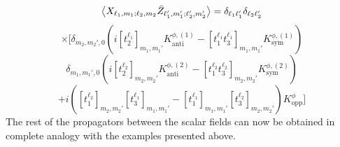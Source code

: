 %
%
\begin{equation*}
\expval{
X_{\ell_1,m_1;\ell_2,m_2}
\bar{Z}_{\ell_1',m_1';\ell_2',m_2'}
}
=
\delta_{\ell_1 \ell_1'} \delta_{\ell_2 \ell_2'}
\end{equation*}
%
%
\begin{equation*}
\times
\Bigg[
\delta_{m_2, m_2',0}
\left(
i [t_2^{\ell_1}]_{m_1,m_1'} K^{\phi,(1)}_{\text{anti}}
- [t_1^{\ell_1} t_3^{\ell_1}]_{m_1,m_1'} K^{\phi,(1)}_{\text{sym}}
\right)
\end{equation*}
%
%
\begin{equation*}
\delta_{m_1, m_1',0}
\left(
i [t_2^{\ell_2}]_{m_2,m_2'} K^{\phi,(2)}_{\text{anti}}
- [t_1^{\ell_2} t_3^{\ell_2}]_{m_2,m_2'} K^{\phi,(2)}_{\text{sym}}
\right)
\end{equation*}
%
%
\begin{equation}
+ i \left(
[t_1^{\ell_2}]_{m_2,m_2'} [t_3^{\ell_1}]_{m_1,m_1'}
-
[t_1^{\ell_1}]_{m_1,m_1'} [t_3^{\ell_2}]_{m_2,m_2'}
\right)
K^{\phi}_{\text{opp}}
\Bigg]
\end{equation}
%
%
The rest of the propagators between the scalar fields can now be obtained in complete analogy with the examples presented above.

